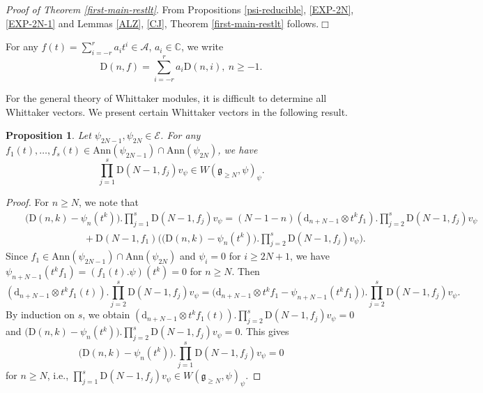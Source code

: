 \documentclass[12pt, a4paper]{amsart}
\newcommand{\fg}{\mathfrak g}
\newcommand{\C}{\mathbb{C}}
\newcommand{\Z}{\mathbb Z}
\newcommand{\rd}{\mathrm{d}}
\newcommand{\rD}{\mathrm{D}}
\theoremstyle{Theorem}
\theoremstyle{Theorem}
\newtheorem{proposition}[thm]{Proposition}
\newtheorem{remark}[thm]{Remark}
\numberwithin{equation}{section}
\begin{document}

{\em Proof of Theorem \ref{first-main-restlt}}. From Propositions
\ref{psi-reducible}, \ref{EXP-2N}, \ref{EXP-2N-1} and Lemmas \ref{ALZ}, \ref{CJ},
Theorem \ref{first-main-restlt} follows.\hfill$\Box$

For any $f(t)=\sum_{i=-r}^{r}a_{i}t^{i}\in\mathcal{A}$, $a_{i}\in\C$, we write
\[\rD(n,f)=\sum_{i=-r}^{r}a_{i}\rD(n,i),\ n\geq-1.\]

For the general theory of Whittaker modules, it is difficult to determine all Whittaker vectors.
We present certain Whittaker vectors in the following result.
\begin{proposition}\label{Whittaker-vector-N}
Let $\psi_{2N-1},\psi_{2N}\in\mathcal{E}$. For any
$f_{1}(t),\dots, f_{s}(t)\in\mathrm{Ann}(\psi_{2N-1})\cap\mathrm{Ann}(\psi_{2N})$, we have
\[\prod_{j=1}^{s}\rD(N-1,f_{j})v_{\psi}\in W(\fg_{\geq N},\psi)_{\psi}.\]
\end{proposition}
\begin{proof}
For $n\geq N$, we note that
\begin{eqnarray*}&&\big(\rD(n,k)-\psi_{n}(t^{k})\big).\prod_{j=1}^{s}\rD(N-1,f_{j})v_{\psi}=(N-1-n)
(\rd_{n+N-1}\otimes t^{k}f_{1}).\prod_{j=2}^{s}\rD(N-1,f_{j})v_{\psi}\\&&
\qquad\qquad\qquad+\rD(N-1,f_{1})\Big(\big(\rD(n,k)-\psi_{n}(t^{k})\big).\prod_{j=2}^{s}\rD(N-1,f_{j})v_{\psi}\Big).\end{eqnarray*}
Since $f_{1}\in\mathrm{Ann}(\psi_{2N-1})\cap\mathrm{Ann}(\psi_{2N})$ and $\psi_{i}=0$ for $i\geq2N+1$,
we have $\psi_{n+N-1}(t^{k}f_{1})=(f_{1}(t).\psi)(t^{k})=0$ for $n\geq N$. Then
\[(\rd_{n+N-1}\otimes t^{k}f_{1}(t)).\prod_{j=2}^{s}\rD(N-1,f_{j})v_{\psi}=\big(\rd_{n+N-1}\otimes t^{k}f_{1}-\psi_{n+N-1}(t^{k}f_{1})\big).\prod_{j=2}^{s}\rD(N-1,f_{j})v_{\psi}.\]
By induction on $s$, we obtain $(\rd_{n+N-1}\otimes t^{k}f_{1}(t)).\prod_{j=2}^{s}\rD(N-1,f_{j})v_{\psi}=0$
and $\big(\rD(n,k)-\psi_{n}(t^{k})\big).\prod_{j=2}^{s}\rD(N-1,f_{j})v_{\psi}=0$. This gives
\[\big(\rD(n,k)-\psi_{n}(t^{k})\big).\prod_{j=1}^{s}\rD(N-1,f_{j})v_{\psi}=0\] for $n\geq N$, i.e.,
$\prod_{j=1}^{s}\rD(N-1,f_{j})v_{\psi}\in W(\fg_{\geq N},\psi)_{\psi}$.
\end{proof}
\end{document}
